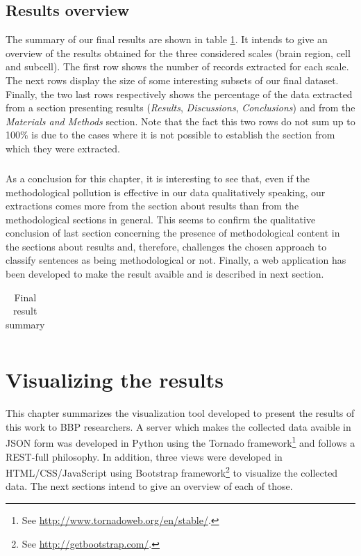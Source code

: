 \documentclass{report}
\begin{document}
                
		
		
		\section{Results overview}
		
			The summary of our final results are shown in table \ref{table:result_summary}. It intends to give
			an overview of the results obtained for the three considered scales (brain region, cell and subcell). The 
			first row shows the number of records extracted for each scale. The next rows display the size of some 
			interesting subsets of our final dataset. 
			Finally, the two last rows respectively shows the percentage of the data 
			extracted from a section presenting results (\textit{Results}, \textit{Discussions}, \textit{Conclusions}) and from the 
			\textit{Materials and Methods} section. Note that the fact this two rows do not sum up to 100\% is due
			to the cases where it is not possible to establish the section from which they were extracted.
			
			\paragraph{}As a conclusion for this chapter, it is interesting to see that, even if the methodological pollution
			is effective in our data qualitatively speaking, our extractions comes more from the section about results
			than from the methodological sections in general. This seems to confirm the qualitative conclusion of last
			section concerning the presence of methodological content in the sections about results and, therefore,
			challenges the chosen approach to classify sentences as being methodological or not. Finally, a web application
			has been developed to make the result avaible and is described in next section.
			
\begin{table}[h]
\begin{tabular}{|l|l|l|l|}
\hline

\hline
\end{tabular}
\caption{Final result summary}
\label{table:result_summary}
\end{table}
			 
		\chapter{Visualizing the results}
		
			This chapter summarizes the visualization tool developed to present the results
			of this work to BBP researchers. A server which makes the collected data
			avaible in JSON form was developed in Python using the Tornado 
			framework\footnote{See \url{http://www.tornadoweb.org/en/stable/}.} and follows a REST-full philosophy.
			In addition, three views were developed in HTML/CSS/JavaScript using Bootstrap framework\footnote{See \url{http://getbootstrap.com/}.} to visualize
			the collected data. The next sections intend to give an overview of each of those.
			
\end{document}
